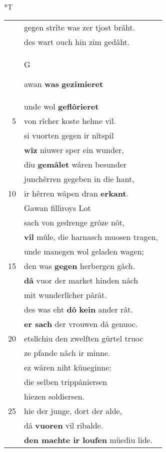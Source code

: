 \documentclass[8pt,a4paper,notitlepage]{article}
\begin{document}
\begin{table}[ht]
\begin{minipage}[t]{0.5\linewidth}
\end{minipage}
\hspace{0.5cm}
\begin{minipage}[t]{0.5\linewidth}
\small
\begin{center}*T
\end{center}
\begin{tabular}{rl}
 & gegen strîte was zer tjost brâht.\\ 
 & des wart ouch hin zim gedâht.\\ 
 & \begin{large}G\end{large}awan \textbf{was} \textbf{gezimieret}\\ 
 & unde wol \textbf{geflôrieret}\\ 
5 & von rîcher koste helme vil.\\ 
 & si vuorten gegen ir nîtspil\\ 
 & \textbf{wîz} niuwer sper ein wunder,\\ 
 & diu \textbf{gemâlet} wâren besunder\\ 
 & junchêrren gegeben in die hant,\\ 
10 & ir hêrren wâpen dran \textbf{erkant}.\\ 
 & Gawan filliroys Lot\\ 
 & sach von gedrenge grôze nôt,\\ 
 & \textbf{vil} mûle, die harnasch muosen tragen,\\ 
 & unde manegen wol geladen wagen;\\ 
15 & den was \textbf{gegen} herbergen gâch.\\ 
 & \textbf{dâ} vuor der market hinden nâch\\ 
 & mit wunderlîcher pârât.\\ 
 & des was eht \textbf{dô} \textbf{kein} ander rât.\\ 
 & \textbf{er sach} der vrouwen dâ genuoc.\\ 
20 & etslîchiu den zwelften gürtel truoc\\ 
 & ze pfande nâch ir minne.\\ 
 & ez wâren niht küneginne:\\ 
 & die selben trippâniersen\\ 
 & hiezen soldiersen.\\ 
25 & hie der junge, dort der alde,\\ 
 & dâ \textbf{vuoren} vil ribalde.\\ 
 & \textbf{den machte ir loufen} müediu lide.\\ 

\end{tabular}
\end{minipage}
\end{table}
\end{document}
